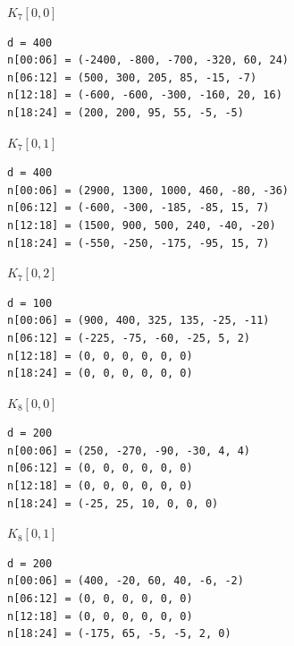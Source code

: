 \par\medskip\noindent\begin{minipage}{\textwidth}
\textbf{$K_{7}[0,0]$}
\begin{Verbatim}[fontsize=\fontsize{8}{9.4}\selectfont]
d = 400
n[00:06] = (-2400, -800, -700, -320, 60, 24)
n[06:12] = (500, 300, 205, 85, -15, -7)
n[12:18] = (-600, -600, -300, -160, 20, 16)
n[18:24] = (200, 200, 95, 55, -5, -5)
\end{Verbatim}
\end{minipage}

\par\medskip\noindent\begin{minipage}{\textwidth}
\textbf{$K_{7}[0,1]$}
\begin{Verbatim}[fontsize=\fontsize{8}{9.4}\selectfont]
d = 400
n[00:06] = (2900, 1300, 1000, 460, -80, -36)
n[06:12] = (-600, -300, -185, -85, 15, 7)
n[12:18] = (1500, 900, 500, 240, -40, -20)
n[18:24] = (-550, -250, -175, -95, 15, 7)
\end{Verbatim}
\end{minipage}

\par\medskip\noindent\begin{minipage}{\textwidth}
\textbf{$K_{7}[0,2]$}
\begin{Verbatim}[fontsize=\fontsize{8}{9.4}\selectfont]
d = 100
n[00:06] = (900, 400, 325, 135, -25, -11)
n[06:12] = (-225, -75, -60, -25, 5, 2)
n[12:18] = (0, 0, 0, 0, 0, 0)
n[18:24] = (0, 0, 0, 0, 0, 0)
\end{Verbatim}
\end{minipage}

\par\medskip\noindent\begin{minipage}{\textwidth}
\textbf{$K_{8}[0,0]$}
\begin{Verbatim}[fontsize=\fontsize{8}{9.4}\selectfont]
d = 200
n[00:06] = (250, -270, -90, -30, 4, 4)
n[06:12] = (0, 0, 0, 0, 0, 0)
n[12:18] = (0, 0, 0, 0, 0, 0)
n[18:24] = (-25, 25, 10, 0, 0, 0)
\end{Verbatim}
\end{minipage}

\par\medskip\noindent\begin{minipage}{\textwidth}
\textbf{$K_{8}[0,1]$}
\begin{Verbatim}[fontsize=\fontsize{8}{9.4}\selectfont]
d = 200
n[00:06] = (400, -20, 60, 40, -6, -2)
n[06:12] = (0, 0, 0, 0, 0, 0)
n[12:18] = (0, 0, 0, 0, 0, 0)
n[18:24] = (-175, 65, -5, -5, 2, 0)
\end{Verbatim}
\end{minipage}


